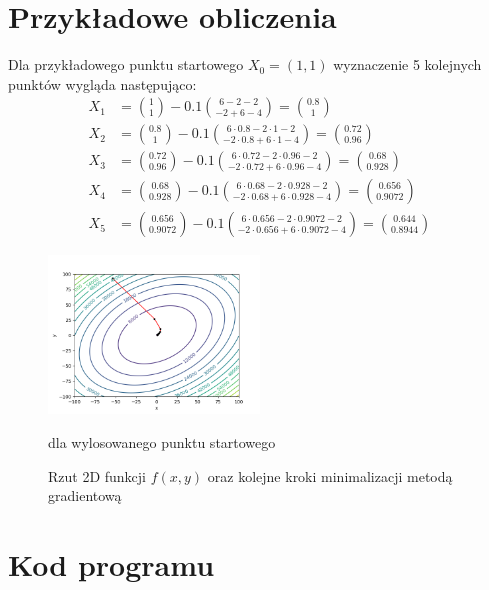 \documentclass{article}
\begin{document}
\section{Przykładowe obliczenia}

Dla przykładowego punktu startowego $X_0 = (1, 1)$
wyznaczenie 5 kolejnych punktów wygląda następująco:
\begin{equation*}
    \begin{aligned}
X_1 &= {{1} \choose {1}} - 0.1 {{6 - 2 - 2}\choose{-2 + 6 - 4}} = {{0.8} \choose {1}} \\
X_2 &= {{0.8} \choose {1}} - 0.1 {{6 \cdot 0.8 - 2 \cdot 1 - 2}\choose{-2 \cdot 0.8 + 6 \cdot 1 - 4}} = {{0.72} \choose {0.96}} \\
X_3 &= {{0.72} \choose {0.96}} - 0.1 {{6 \cdot 0.72 - 2 \cdot 0.96 - 2}\choose{-2 \cdot 0.72 + 6 \cdot 0.96 - 4}} = {{0.68} \choose {0.928}} \\
X_4 &= {{0.68} \choose {0.928}} - 0.1 {{6 \cdot 0.68 - 2 \cdot 0.928 - 2}\choose{-2 \cdot 0.68 + 6 \cdot 0.928 - 4}} = {{0.656} \choose {0.9072}} \\
X_5 &= {{0.656} \choose {0.9072}} - 0.1 {{6 \cdot 0.656 - 2 \cdot 0.9072 - 2}\choose{-2 \cdot 0.656 + 6 \cdot 0.9072 - 4}} = {{0.644} \choose {0.8944}}
    \end{aligned}
\end{equation*}


\begin{figure}[H]
    \centering
    \includegraphics[width=0.5\textwidth]{plot.png}
    \caption{Rzut 2D funkcji $f(x, y)$ oraz kolejne kroki
    minimalizacji metodą gradientową} {dla wylosowanego punktu startowego}
\end{figure}


\section{Kod programu}

\end{document}
